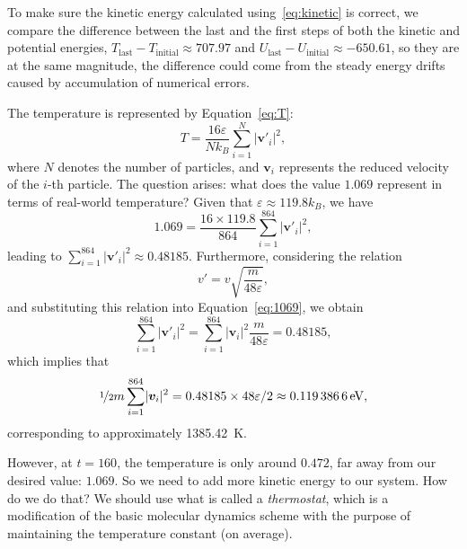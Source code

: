 To make sure the kinetic energy calculated using~\eqref{eq:kinetic} is correct, we compare
the difference between the last and the first steps of both the kinetic and potential
energies, \(T_\text{last} - T_\text{initial} \approx 707.97\) and
\(U_\text{last} - U_\text{initial} \approx -650.61\), so they are at the same magnitude,
the difference could come from the steady energy drifts caused by accumulation of
numerical errors.

The temperature is represented by Equation~\eqref{eq:T}:
%
\begin{equation}\label{eq:T}
    T = \frac{16\varepsilon}{N k_B} \sum_{i=1}^{N} \lvert \bm{v}'_i \rvert^2,
\end{equation}
%
where \(N\) denotes the number of particles, and \(\bm{v}_i\) represents the reduced
velocity of the \(i\)-th particle. The question arises: what does the value \(1.069\)
represent in terms of real-world temperature? Given that \(\varepsilon \approx 119.8 k_B\),
we have
%
\begin{equation}\label{eq:1069}
    1.069 = \frac{16 \times 119.8}{864} \sum_{i=1}^{864} \lvert \bm{v}'_i \rvert^2,
\end{equation}
%
leading to \(\sum_{i=1}^{864} \lvert \bm{v}'_i \rvert^2 \approx 0.48185\). Furthermore,
considering the relation
%
\begin{equation}
    v' = v \sqrt{\frac{m}{48\varepsilon}},
\end{equation}
%
and substituting this relation into Equation~\eqref{eq:1069}, we obtain
%
\begin{equation}
    \sum_{i=1}^{864} \lvert \bm{v}'_i \rvert^2 = \sum_{i=1}^{864} \lvert \bm{v}_i \rvert^2 \frac{m}{48\varepsilon} = 0.48185,
\end{equation}
%
which implies that
%
\begin{equation}
    \nicefrac{1}{2} m\sum_{i=1}^{864} \lvert \bm{v}_i \rvert^2 = 0.48185 \times 48\varepsilon / 2 \approx \qty{0.1193866}{\electronvolt},
\end{equation}
%
corresponding to approximately \qty{1385.42}{\kelvin}.

However, at \(t = 160\), the temperature is only around \(0.472\), far away from our desired
value: \(1.069\). So we need to add more kinetic energy to our system. How do we do that?
We should use what is called a \emph{thermostat}, which is
a modiﬁcation of the basic molecular dynamics scheme with the purpose of maintaining the
temperature constant (on average).

